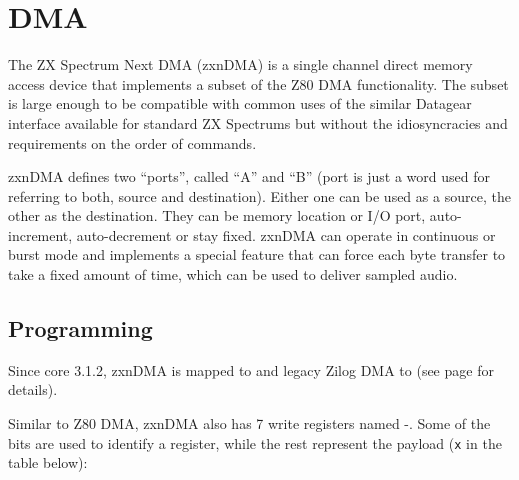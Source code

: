 \section{DMA}
\label{zx_next_dma}




The ZX Spectrum Next DMA (zxnDMA) is a single channel direct memory access device that implements a subset of the Z80 DMA functionality. The subset is large enough to be compatible with common uses of the similar Datagear interface available for standard ZX Spectrums but without the idiosyncracies and requirements on the order of commands.

zxnDMA defines two ``ports'', called ``A'' and ``B'' (port is just a word used for referring to both, source and destination). Either one can be used as a source, the other as the destination. They can be memory location or I/O port, auto-increment, auto-decrement or stay fixed. zxnDMA can operate in continuous or burst mode and implements a special feature that can force each byte transfer to take a fixed amount of time, which can be used to deliver sampled audio.


\subsection{Programming}

Since core 3.1.2, zxnDMA is mapped to  and legacy Zilog DMA to  (see page  for details).

Similar to Z80 DMA, zxnDMA also has 7 write registers named -. Some of the bits are used to identify a register, while the rest represent the payload ({\tt x} in the table below):

